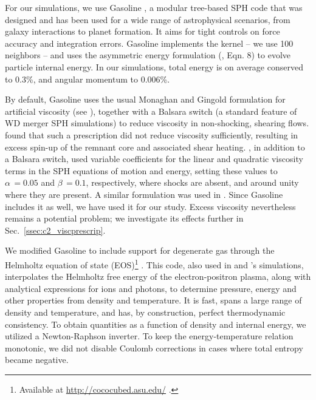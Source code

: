 For our simulations, we use Gasoline \citep{wadssq04}, a modular tree-based SPH code that was designed and has been used for a wide range of astrophysical scenarios, from galaxy interactions to planet formation.  It aims for tight controls on force accuracy and integration errors.  Gasoline implements the \cite{hernk89} kernel -- we use 100 neighbors -- and uses the asymmetric energy formulation (\citealt{wadssq04}, Eqn. 8) to evolve particle internal energy.  In our simulations, total energy is on average conserved to 0.3\%, and angular momentum to 0.006\%.

By default, Gasoline uses the usual Monaghan and Gingold formulation for artificial viscosity (see \citealt{mona05}), together with a Balsara switch (a standard feature of WD merger SPH simulations) to reduce viscosity in non-shocking, shearing flows.  \cite{guerig04} found that such a prescription did not reduce viscosity sufficiently, resulting in excess spin-up of the remnant core and associated shear heating.  \cite{yoonpr07}, in addition to a Balsara switch, used variable coefficients for the linear and quadratic viscosity terms in the SPH equations of motion and energy, setting these values to $\alpha\,=0.05$ and $\beta\,=0.1$, respectively, where shocks are absent, and around unity where they are present.  A similar formulation was used in \cite{dan+11,dan+12}.  Since Gasoline includes it as well, we have used it for our study.  Excess viscosity nevertheless remains a potential problem;  we investigate its effects further in Sec.~\ref{ssec:c2_viscprescrip}.

We modified Gasoline to include support for degenerate gas through the Helmholtz equation of state (EOS)\footnote{Available at \url{http://cococubed.asu.edu/} .} \citep{timms00}.  This code, also used in \cite{rask+12} and \cite{dan+12}'s simulations, interpolates the Helmholtz free energy of the electron-positron plasma, along with analytical expressions for ions and photons, to determine pressure, energy and other properties from density and temperature.  It is fast, spans a large range of density and temperature, and has, by construction, perfect thermodynamic consistency.  To obtain quantities as a function of density and internal energy, we utilized a Newton-Raphson inverter.  To keep the energy-temperature relation {\charles monotonic}, we did not disable Coulomb corrections in cases where total entropy became negative.


